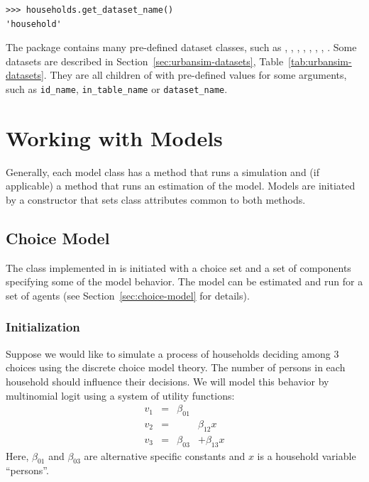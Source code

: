 \begin{verbatim}
>>> households.get_dataset_name()
'household'
\end{verbatim}

The  package contains many pre-defined dataset \datasetindex classes, such as , ,
  , , , , ,
  . Some datasets are described in  Section~\ref{sec:urbansim-datasets},
  Table~\ref{tab:urbansim-datasets}. They are all children of  with pre-defined values
  for some arguments, such as \verb|id_name|, \verb|in_table_name| or \verb|dataset_name|. 

  

%
\section{Working with Models}
%
Generally, each model class has a method  that runs a simulation and
(if applicable) a method  that runs an estimation of the model.
Models are initiated by a constructor that sets class attributes common to
both methods.

%
\subsection{Choice Model}
%
The class  implemented in  is initiated with a choice set
and a set of components specifying some of the model behavior. The model can
be estimated and run for a set of agents (see Section~\ref{sec:choice-model} for details).

%
\subsubsection{Initialization}
%
Suppose we would like to simulate a process of households deciding among 3
choices using the discrete choice model theory. The number of persons in each
household should influence their decisions. We will model this behavior by
multinomial logit using a system of utility functions:
$$
\begin{array}{rcrr}
v_1 & = &\beta_{01} & \\
v_2 & = &  & \beta_{12}x \\
v_3 & = & \beta_{03} & +  \beta_{13}x
\end{array}
$$
Here, $\beta_{01}$ and $\beta_{03}$ are alternative specific constants and $x$
is a household variable \variablesindex ``persons''.

